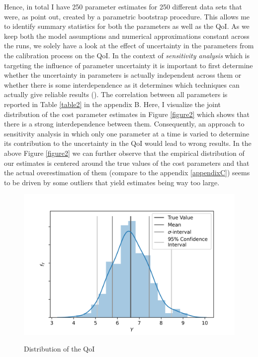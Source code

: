 Hence, in total I have 250 parameter estimates for 250 different data sets that were, as \cite{Su.Judd.2012} point out, created by a parametric bootstrap procedure. This allows me to identify summary statistics for both the parameters as well as the QoI. As we keep both the model assumptions and numerical approximations constant across the runs, we solely have a look at the effect of uncertainty in the parameters from the calibration process on the QoI. In the context of \textit{sensitivity analysis} which is targeting the influence of parameter uncertainty it is important to first determine whether the uncertainty in parameters is actually independent across them or whether there is some interdependence as it determines which techniques can actually give reliable results (\cite{Saltelli.2008}). The correlation between all parameters is reported in Table \ref{table2} in the appendix B. Here, I visualize the joint distribution of the cost parameter estimates in Figure \ref{figure2} which shows that there is a strong interdependence between them. Consequently, an approach to sensitivity analysis in which only one parameter at a time is varied to determine its contribution to the uncertainty in the QoI would lead to wrong results. In the above Figure \ref{figure2} we can further observe that the empirical distribution of our estimates is centered around the true values of the cost parameters and that the actual overestimation of them (compare to the appendix \ref{appendixC}) seems to be driven by some outliers that yield estimates being way too large.

\begin{figure}[!t]
	\caption{Distribution of the QoI}
	\vspace*{-4mm}
	\centering
	\includegraphics[scale=0.9]{../figures/figure_3.png}
	\label{figure3}
\end{figure}

